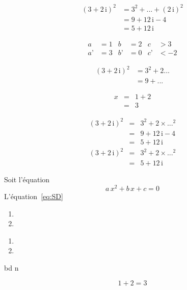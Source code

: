 \documentclass[12pt,a4paper,oneside,twocolumn]{article} %
\numberwithin{equation}{section}
\begin{document}
\begin{equation} 
\begin{split} %
(3 + 2\,\mathrm{i})^2 
& = 3^2 + ... + (2\,\mathrm{i})^2 \\
& = 9 + 12\,\mathrm{i} - 4 \\
& = 5 + 12\,\mathrm{i}
\end{split}
\end{equation}

\begin{align*}
a&=1 & b&=2 & c&>3\\
a’&=3 & b’&=0 & c’& <-2
\end{align*}

\begin{align}
(3 + 2\,\mathrm{i})^2 &= 3^2 + 2 ... \\
& = 9 + ...
\end{align}

{\setlength{\jot}{1cm}
\begin{eqnarray*}
x&=&1+2\\&=&3
\end{eqnarray*}}

\begin{eqnarray}%
(3 + 2\,\mathrm{i})^2 & = &
3^2 + 2 \times ... ^2\\
& = & 9 + 12\,\mathrm{i} - 4 \nonumber\\
& = & 5 + 12\,\mathrm{i}
\end{eqnarray}
\begin{eqnarray*}
(3 + 2\,\mathrm{i})^2 & = &
3^2 + 2 \times ... ^2 \\
& = & 5 + 12\,\mathrm{i}
\end{eqnarray*}

Soit l’équation
\begin{equation}
a\,x^2+b\,x+c=0 \label{eq:SD}
\end{equation}
L’équation~\eqref{eq:SD}

\begin{enumerate}
\item 
\item 
\end{enumerate}
\begin{enumerate}
\item 
\item 
\end{enumerate}

b{\center d \endcenter}n

 \begin{equation*}
1+2=3 
\tag{A}
\end{equation*}
\end{document}
